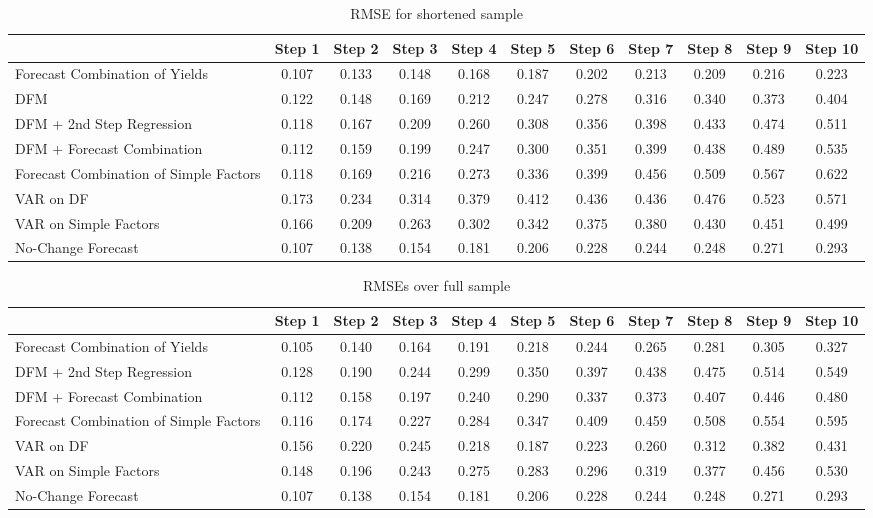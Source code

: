 \documentclass[12pt]{article}
\begin{document}
\begin{sidewaystable}
\center
\caption{RMSE for shortened sample}
\begin{tabular}{|l|c|c|c|c|c|c|c|c|c|c|}
\hline
&Step 1 &Step 2 &Step 3 &Step 4 &Step 5 &Step 6 &Step 7 &Step 8 &Step 9 &Step 10\\
\hline
Forecast Combination of Yields        &0.107&0.133&0.148&0.168&0.187&0.202&0.213&0.209&0.216&0.223\\
DFM                                   &0.122&0.148&0.169&0.212&0.247&0.278&0.316&0.340&0.373&0.404\\
DFM + 2nd Step Regression             &0.118&0.167&0.209&0.260&0.308&0.356&0.398&0.433&0.474&0.511\\
DFM + Forecast Combination            &0.112&0.159&0.199&0.247&0.300&0.351&0.399&0.438&0.489&0.535\\
Forecast Combination of Simple Factors&0.118&0.169&0.216&0.273&0.336&0.399&0.456&0.509&0.567&0.622\\
VAR on DF                             &0.173&0.234&0.314&0.379&0.412&0.436&0.436&0.476&0.523&0.571\\
VAR on Simple Factors                 &0.166&0.209&0.263&0.302&0.342&0.375&0.380&0.430&0.451&0.499\\
No-Change Forecast                    &0.107&0.138&0.154&0.181&0.206&0.228&0.244&0.248&0.271&0.293\\
\hline
\end{tabular}
\end{sidewaystable}



\clearpage
\begin{sidewaystable}
\caption{RMSEs over full sample}
\center
\begin{tabular}{|l|c|c|c|c|c|c|c|c|c|c|}
\hline
&Step 1 &Step 2 &Step 3 &Step 4 &Step 5 &Step 6 &Step 7 &Step 8 &Step 9 &Step 10\\
\hline
Forecast Combination of Yields        &0.105&0.140&0.164&0.191&0.218&0.244&0.265&0.281&0.305&0.327\\
DFM + 2nd Step Regression             &0.128&0.190&0.244&0.299&0.350&0.397&0.438&0.475&0.514&0.549\\
DFM + Forecast Combination            &0.112&0.158&0.197&0.240&0.290&0.337&0.373&0.407&0.446&0.480\\
Forecast Combination of Simple Factors&0.116&0.174&0.227&0.284&0.347&0.409&0.459&0.508&0.554&0.595\\
VAR on DF                             &0.156&0.220&0.245&0.218&0.187&0.223&0.260&0.312&0.382&0.431\\
VAR on Simple Factors                 &0.148&0.196&0.243&0.275&0.283&0.296&0.319&0.377&0.456&0.530\\
No-Change Forecast                    &0.107&0.138&0.154&0.181&0.206&0.228&0.244&0.248&0.271&0.293\\
\hline
\end{tabular}
\end{sidewaystable}
\end{document}
